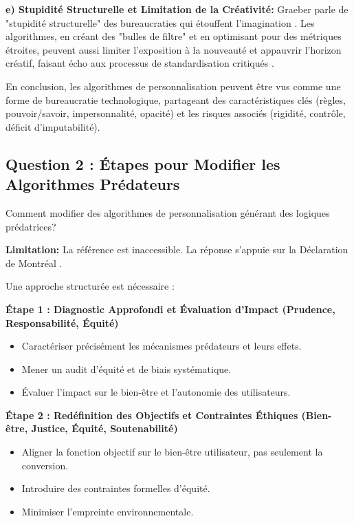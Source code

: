 \documentclass[11pt,a4paper]{article}
\begin{document}
\textbf{e) Stupidité Structurelle et Limitation de la Créativité:}
Graeber parle de "stupidité structurelle" des bureaucraties qui étouffent l'imagination \cite{Graeber2015}. Les algorithmes, en créant des "bulles de filtre" et en optimisant pour des métriques étroites, peuvent aussi limiter l'exposition à la nouveauté et appauvrir l'horizon créatif, faisant écho aux processus de standardisation critiqués \cite{SerpaFerreira2019, Graeber2015}.

En conclusion, les algorithmes de personnalisation peuvent être vus comme une forme de bureaucratie technologique, partageant des caractéristiques clés (règles, pouvoir/savoir, impersonnalité, opacité) et les risques associés (rigidité, contrôle, déficit d'imputabilité).

\subsection{Question 2 : Étapes pour Modifier les Algorithmes Prédateurs}
Comment modifier des algorithmes de personnalisation générant des logiques prédatrices?

\textbf{Limitation:} La référence \cite{PraxisInaccessible} est inaccessible. La réponse s'appuie sur la Déclaration de Montréal \cite{DeclarationMontreal2018}.

Une approche structurée est nécessaire :

\textbf{Étape 1 : Diagnostic Approfondi et Évaluation d'Impact (Prudence, Responsabilité, Équité)}
\begin{itemize}
    \item Caractériser précisément les mécanismes prédateurs et leurs effets.
    \item Mener un audit d'équité et de biais systématique.
    \item Évaluer l'impact sur le bien-être et l'autonomie des utilisateurs.
\end{itemize}

\textbf{Étape 2 : Redéfinition des Objectifs et Contraintes Éthiques (Bien-être, Justice, Équité, Soutenabilité)}
\begin{itemize}
    \item Aligner la fonction objectif sur le bien-être utilisateur, pas seulement la conversion.
    \item Introduire des contraintes formelles d'équité.
    \item Minimiser l'empreinte environnementale.
\end{itemize}
\end{document}

